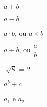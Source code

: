 \documentclass[a4paper, 12pt]{article}
\begin{document}
$a + b$ %

$a - b$ %

$a\cdot b$, ou $ a \times b$ %

$a \div b$, ou $\dfrac{a}{b}$ %


$\sqrt[3]{8}$ = 2

$a^{b} + c $

$a_{1}$ e $a_{2}$
	
\end{document}
